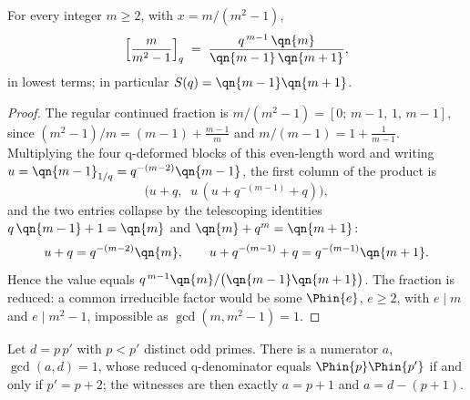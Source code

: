 \begin{proposition}\label{prop:diffsquares}
For every integer $m\ge2$, with $x=m/(m^{2}-1)$,
\[
  \Bigl[\frac{m}{m^{2}-1}\Bigr]_q
  \;=\;
  \frac{q^{\,m-1}\,\qn{m}}{\qn{m-1}\,\qn{m+1}},
\]
in lowest terms; in particular $S(q)=\qn{m-1}\qn{m+1}$.
\end{proposition}

\begin{proof}
The regular continued fraction is $m/(m^{2}-1)=[0;\,m-1,\,1,\,m-1]$, since
$(m^{2}-1)/m=(m-1)+\tfrac{m-1}{m}$ and $m/(m-1)=1+\tfrac1{m-1}$. Multiplying
the four q-deformed blocks of this even-length word and writing
$u=\qn{m-1}_{1/q}=q^{-(m-2)}\qn{m-1}$, the first column of the product is
\[
  \bigl(u+q,\;\;u\,(u+q^{-(m-1)}+q)\bigr),
\]
and the two entries collapse by the telescoping identities
$q\,\qn{m-1}+1=\qn{m}$ and $\qn{m}+q^{m}=\qn{m+1}$:
\[
  u+q=q^{-(m-2)}\qn{m},
  \qquad
  u+q^{-(m-1)}+q=q^{-(m-1)}\qn{m+1}.
\]
Hence the value equals $q^{\,m-1}\qn{m}/\bigl(\qn{m-1}\qn{m+1}\bigr)$. The
fraction is reduced: a common irreducible factor would be some $\Phin{e}$,
$e\ge2$, with $e\mid m$ and $e\mid m^{2}-1$, impossible as
$\gcd(m,m^{2}-1)=1$.
\end{proof}

\begin{theorem}\label{thm:twin}
Let $d=p\,p'$ with $p<p'$ distinct odd primes. There is a numerator $a$,
$\gcd(a,d)=1$, whose reduced q-denominator equals $\Phin{p}\Phin{p'}$ if and
only if $p'=p+2$; the witnesses are then exactly $a=p+1$ and $a=d-(p+1)$.
\end{theorem}

